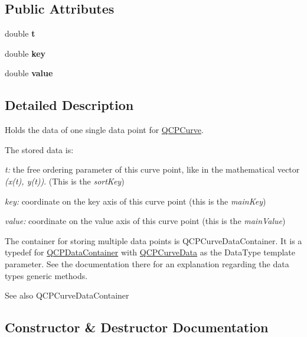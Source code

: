 \subsection*{Public Attributes}
\begin{DoxyCompactItemize}
\item 
\mbox{\label{class_q_c_p_curve_data_aecc395525be28e9178a088793beb3ff3}} 
double {\bfseries t}
\item 
\mbox{\label{class_q_c_p_curve_data_a8a4ec5f2b9a396149fd842e309701bd4}} 
double {\bfseries key}
\item 
\mbox{\label{class_q_c_p_curve_data_a72b39b8e1dbf7b45382ebd48419b6828}} 
double {\bfseries value}
\end{DoxyCompactItemize}


\subsection{Detailed Description}
Holds the data of one single data point for \hyperlink{class_q_c_p_curve}{Q\+C\+P\+Curve}. 

The stored data is\+: \begin{DoxyItemize}
\item {\itshape t\+:} the free ordering parameter of this curve point, like in the mathematical vector {\itshape (x(t), y(t))}. (This is the {\itshape sort\+Key}) \item {\itshape key\+:} coordinate on the key axis of this curve point (this is the {\itshape main\+Key}) \item {\itshape value\+:} coordinate on the value axis of this curve point (this is the {\itshape main\+Value})\end{DoxyItemize}
The container for storing multiple data points is Q\+C\+P\+Curve\+Data\+Container. It is a typedef for \hyperlink{class_q_c_p_data_container}{Q\+C\+P\+Data\+Container} with \hyperlink{class_q_c_p_curve_data}{Q\+C\+P\+Curve\+Data} as the Data\+Type template parameter. See the documentation there for an explanation regarding the data type\textquotesingle{}s generic methods.

\begin{DoxySeeAlso}{See also}
Q\+C\+P\+Curve\+Data\+Container 
\end{DoxySeeAlso}


\subsection{Constructor \& Destructor Documentation}
\mbox{\label{class_q_c_p_curve_data_a48252779b5198a509d99c69ae223fbf8}} 
